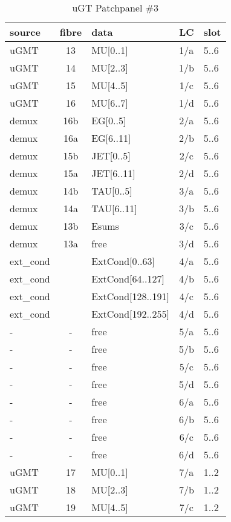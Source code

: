 \begin{longtable}{|l|c|l|c|l|}
\caption{uGT Patchpanel \#3}
    \label{tab:app:ugt_opt_pp_2}\\
\hline
\textbf{source}& \textbf{fibre}& \textbf{data}& \textbf{LC}& \textbf{slot}\\
\hline
\hline
\endhead
uGMT  & 13  & MU[0..1]   & 1/a  & 5..6 \\\hline
uGMT  & 14  & MU[2..3]   & 1/b  & 5..6 \\\hline
uGMT  & 15  & MU[4..5]   & 1/c  & 5..6 \\\hline
uGMT  & 16  & MU[6..7]   & 1/d  & 5..6 \\\hline
demux & 16b & EG[0..5]   & 2/a  & 5..6 \\\hline
demux & 16a & EG[6..11]  & 2/b  & 5..6 \\\hline
demux & 15b & JET[0..5]  & 2/c  & 5..6 \\\hline
demux & 15a & JET[6..11] & 2/d  & 5..6 \\\hline
demux & 14b & TAU[0..5]  & 3/a  & 5..6 \\\hline
demux & 14a & TAU[6..11] & 3/b  & 5..6 \\\hline
demux & 13b & Esums      & 3/c  & 5..6 \\\hline
demux & 13a & free      & 3/d  & 5..6 \\\hline
ext\_cond &     & ExtCond[0..63]    & 4/a  & 5..6 \\\hline
ext\_cond &     & ExtCond[64..127]  & 4/b  & 5..6 \\\hline
ext\_cond &     & ExtCond[128..191] & 4/c  & 5..6 \\\hline
ext\_cond &     & ExtCond[192..255] & 4/d  & 5..6 \\\hline
- & - & free & 5/a  & 5..6 \\\hline
- & - & free & 5/b  & 5..6 \\\hline
- & - & free & 5/c  & 5..6 \\\hline
- & - & free & 5/d  & 5..6 \\\hline
- & - & free & 6/a  & 5..6 \\\hline
- & - & free & 6/b  & 5..6 \\\hline
- & - & free & 6/c  & 5..6 \\\hline
- & - & free & 6/d  & 5..6 \\\hline
\hline
uGMT  & 17  & MU[0..1]   & 7/a  & 1..2 \\\hline
uGMT  & 18  & MU[2..3]   & 7/b  & 1..2 \\\hline
uGMT  & 19  & MU[4..5]   & 7/c  & 1..2 \\\hline

\end{longtable}
